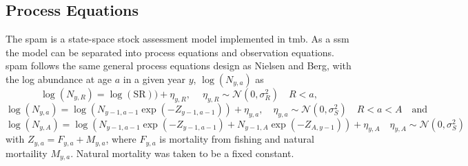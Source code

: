 \documentclass[11pt]{article}\usepackage[]{graphicx}\usepackage[]{color}
\begin{document}
\subsection{Process Equations}
The \acrfull{spam} is a state-space stock assessment model implemented in \acrfull{tmb}. As a \acrfull{ssm} the model can be separated into process equations and observation equations. \acrshort{spam} follows the same general process equations design as Nielsen and Berg\cite{Nielsen2014Estimation-of-t}, with the log abundance at age $a$ in a given year $y$, $\log(N_{y,a})$ as 
\begin{equation}\label{Nrec}
  \log(N_{y,R}) = \log(\text{SR})) + \eta_{y,R}, \quad \ \eta_{y,R} \sim \mathcal{N}(0,\sigma_R^2) \quad R < a ,
\end{equation}
\begin{equation}\label{Nsur}
  \log(N_{y,a}) = \log(N_{y-1,a-1}\exp(-Z_{y-1,a-1})) + \eta_{y,a}, \quad \eta_{y,a} \sim \mathcal{N}(0,\sigma_S^2) \quad R < a < A \quad \text{and}
\end{equation}
\begin{equation}\label{Nplus}
  \log(N_{y,A}) = \log(N_{y-1,a-1}\exp(-Z_{y-1,a-1})+N_{y-1,A}\exp(-Z_{A,y-1})) + \eta_{y,A} \quad \eta_{y,A} \sim \mathcal{N}(0,\sigma^2_S)
\end{equation}
with $Z_{y,a} = F_{y,a} + M_{y,a}$, where $F_{y,a}$ is mortality from fishing and natural mortaility $M_{y,a}$. Natural mortality was taken to be a fixed constant.
\end{document}
